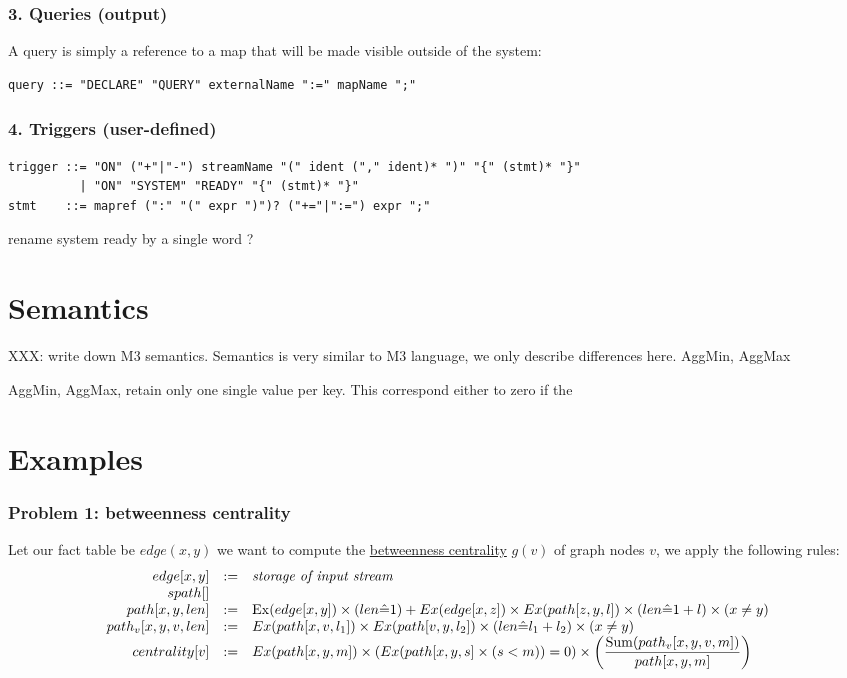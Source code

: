 \documentclass[11pt]{article}
\begin{document}
\subsubsection*{3. Queries (output)}
A query is simply a reference to a map that will be made visible outside of the system:
\begin{verbatim}
query ::= "DECLARE" "QUERY" externalName ":=" mapName ";"
\end{verbatim}

\subsubsection*{4. Triggers (user-defined)}
\begin{verbatim}
trigger ::= "ON" ("+"|"-") streamName "(" ident ("," ident)* ")" "{" (stmt)* "}"
          | "ON" "SYSTEM" "READY" "{" (stmt)* "}"
stmt    ::= mapref (":" "(" expr ")")? ("+="|":=") expr ";"
\end{verbatim}

rename system ready by a single word ?




\section*{Semantics}
XXX: write down M3 semantics.
Semantics is very similar to M3 language, we only describe differences here.
AggMin, AggMax

AggMin, AggMax, retain only one single value per key. This correspond either to zero if the 

\section*{Examples}
\subsubsection*{Problem 1: betweenness centrality}
Let our fact table be $edge(x,y)$ we want to compute the \href{http://en.wikipedia.org/wiki/Betweenness_centrality}{betweenness centrality} $g(v)$ of graph nodes $v$, we apply the following rules:
\def\Ex{{\rm Ex}}
\[\begin{array}{rcl}
edge[x,y] & := & \text{\it storage of input stream} \\

spath[] \\

path[x,y,len] & := & \Ex(edge[x,y]) \times (len\hat= 1) +  Ex(edge[x,z]) \times Ex(path[z,y,l]) \times (len\hat= 1+l) \times (x\ne y)\\
path_v[x,y,v,len] & := & Ex(path[x,v,l_1]) \times Ex(path[v,y,l_2]) \times (len\hat= l_1+l_2) \times (x\ne y) \\
centrality[v] & := & Ex(path[x,y,m]) \times (Ex(path[x,y,s] \times (s<m)) = 0) \times \left(\dfrac{{\rm Sum}(path_v[x,y,v,m])}{path[x,y,m]}\right)
\end{array}\]
\end{document}
